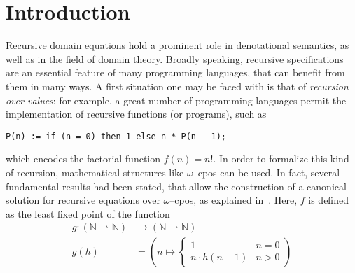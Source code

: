 \section{Introduction}

\nocite{Hemerik1988}

Recursive domain equations hold a prominent role in denotational semantics, as well as in the field of domain theory.
Broadly speaking, recursive specifications are an essential feature of many programming languages, that can benefit from them in many ways.
A first situation one may be faced with is that of \emph{recursion over values}: for example, a great number of programming languages permit the implementation of recursive functions (or programs), such as
\begin{center}
  \texttt{P(n) := if (n = 0) then 1 else n * P(n - 1);}
\end{center}
which encodes the factorial function \(f(n) = n!\).
In order to formalize this kind of recursion, mathematical structures like \(\omega\)--cpos can be used. %
In fact, several fundamental results had been stated, that allow the construction of a canonical solution for recursive equations over \(\omega\)--cpos, as explained in~\cite{Winskel1993}.
Here, \(f\) is defined as the least fixed point of the function
\begin{equation*}
  \begin{split}
    g \colon (\mathbb{N} \rightharpoonup \mathbb{N}) &\to (\mathbb{N} \rightharpoonup \mathbb{N}) \\
    g(h) &= \left(n \mapsto \begin{cases}1 & n = 0 \\ n\cdot h(n-1) & n > 0\end{cases}\right)
  \end{split}
\end{equation*}
